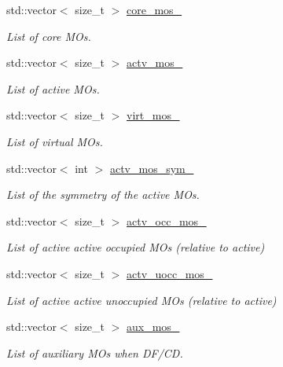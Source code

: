 \begin{DoxyCompactItemize}
std\+::vector$<$ size\+\_\+t $>$ \mbox{\hyperlink{classforte_1_1_s_a_d_s_r_g_a1fc94107eb3428dc262bef92e5a723d1}{core\+\_\+mos\+\_\+}}
\begin{DoxyCompactList}\small\item\em List of core M\+Os. \end{DoxyCompactList}\item 
std\+::vector$<$ size\+\_\+t $>$ \mbox{\hyperlink{classforte_1_1_s_a_d_s_r_g_a167f0ebda3048bcd64fc0f0f9614d24f}{actv\+\_\+mos\+\_\+}}
\begin{DoxyCompactList}\small\item\em List of active M\+Os. \end{DoxyCompactList}\item 
std\+::vector$<$ size\+\_\+t $>$ \mbox{\hyperlink{classforte_1_1_s_a_d_s_r_g_a52e25c282a710e0b89d941b1fa19930d}{virt\+\_\+mos\+\_\+}}
\begin{DoxyCompactList}\small\item\em List of virtual M\+Os. \end{DoxyCompactList}\item 
std\+::vector$<$ int $>$ \mbox{\hyperlink{classforte_1_1_s_a_d_s_r_g_adad42fa3d7143e5664516d7686a66a24}{actv\+\_\+mos\+\_\+sym\+\_\+}}
\begin{DoxyCompactList}\small\item\em List of the symmetry of the active M\+Os. \end{DoxyCompactList}\item 
std\+::vector$<$ size\+\_\+t $>$ \mbox{\hyperlink{classforte_1_1_s_a_d_s_r_g_a906469f68b23df09810e988056351fad}{actv\+\_\+occ\+\_\+mos\+\_\+}}
\begin{DoxyCompactList}\small\item\em List of active active occupied M\+Os (relative to active) \end{DoxyCompactList}\item 
std\+::vector$<$ size\+\_\+t $>$ \mbox{\hyperlink{classforte_1_1_s_a_d_s_r_g_af0255a49429047511059dc393bd15864}{actv\+\_\+uocc\+\_\+mos\+\_\+}}
\begin{DoxyCompactList}\small\item\em List of active active unoccupied M\+Os (relative to active) \end{DoxyCompactList}\item 
std\+::vector$<$ size\+\_\+t $>$ \mbox{\hyperlink{classforte_1_1_s_a_d_s_r_g_a9f442eeb1de90e83a1a84e59fca50bac}{aux\+\_\+mos\+\_\+}}
\begin{DoxyCompactList}\small\item\em List of auxiliary M\+Os when D\+F/\+CD. \end{DoxyCompactList}\item 

\end{DoxyCompactItemize}
